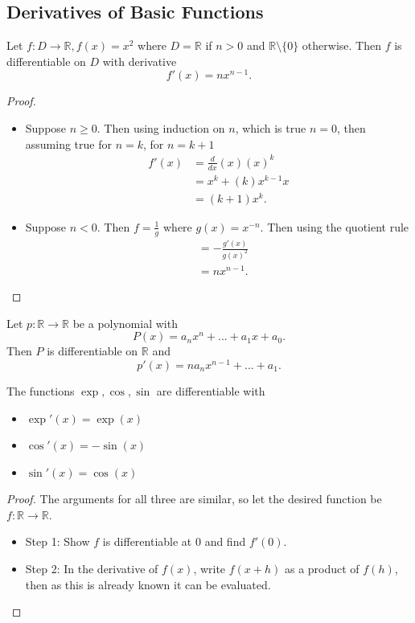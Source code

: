 \subsection{Derivatives of Basic Functions}

\begin{prop}
  Let $f : D \rightarrow \mathbb{R}, f(x) = x^2$ where $D = \mathbb{R}$ if $n > 0$ and $\mathbb{R} \setminus \{0\}$ otherwise. Then $f$ is differentiable on $D$ with derivative
  \[f'(x) = n x ^{n-1}.\]
\end{prop}
\begin{proof}
    \begin{itemize}
      \item Suppose $n \geq 0$. Then using induction on $n$, which is true $n = 0$, then assuming true for $n= k$, for $n = k + 1$
        \begin{align*}
          f'(x) &= \frac{d}{dx} (x)(x)^k  \\
                &= x^k + (k)x^{k-1} x \\
                &= (k + 1)x^k
        .\end{align*}
      \item Suppose $n < 0$. Then $f = \frac{1}{g}$ where $g(x) = x^{-n}$. Then using the quotient rule
        \begin{align*}
                &= - \frac{g'(x)}{g(x)^2} \\
                &= n x^{n - 1}
        .\end{align*}
    \end{itemize}
\end{proof}

\begin{corollary}
Let $p: \mathbb{R} \rightarrow \mathbb{R}$ be a polynomial with 
\[P(x) = a_n x^n + ... + a_1 x + a_0.\]
Then $P$ is differentiable on $\mathbb{R}$ and
\[p'(x) = n a_n x^{n - 1} + ... + a_1.\]
\end{corollary}

\begin{prop}
    The functions $\exp, \cos, \sin$ are differentiable with
    \begin{itemize}
      \item $\exp'(x) = \exp(x)$
      \item $\cos'(x) = - \sin (x)$
      \item $\sin'(x) = \cos(x)$
    \end{itemize}
\end{prop}
\begin{proof}
   The arguments for all three are similar, so let the desired function be $f : \mathbb{R} \rightarrow \mathbb{R}$.
   \begin{itemize}
     \item Step 1: Show $f$ is differentiable at $0$ and find $f'(0)$.
     \item Step 2: In the derivative of $f(x)$, write $f(x + h)$ as a product of $f(h)$, then as this is already known it can be evaluated.
   \end{itemize}
\end{proof}

